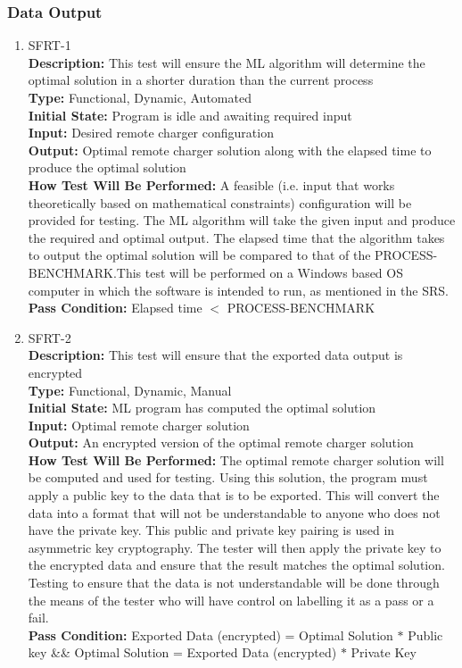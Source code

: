 \documentclass[12pt, titlepage]{article}
\begin{document}
\subsubsection{Data Output}
\begin{enumerate}
    \hypertarget{SFRT-1Anchor}{}
    \item{SFRT-1\\}
    \textbf{Description:} This test will ensure the ML algorithm will determine the optimal solution in a shorter duration than the current process\\
    \textbf{Type:} Functional, Dynamic, Automated\\
    \textbf{Initial State:} Program is idle and awaiting required input\\
    \textbf{Input:} Desired remote charger configuration\\
    \textbf{Output:} Optimal remote charger solution along with the elapsed time to produce the optimal solution\\
    \textbf{How Test Will Be Performed:} A feasible (i.e. input that works theoretically based on mathematical constraints) configuration will be provided for testing. The ML algorithm will take the given input and produce the required and optimal output. The elapsed time that the algorithm takes to output the optimal solution will be compared to that of the PROCESS-BENCHMARK.This test will be performed on a Windows based OS computer in which the software is intended to run, as mentioned in the SRS. \\
    \textbf{Pass Condition:} Elapsed time $<$ PROCESS-BENCHMARK\\

    \hypertarget{SFRT-2Anchor}{}
    \item{SFRT-2\\}
    \textbf{Description:} This test will ensure that the exported data output is encrypted\\
    \textbf{Type:} Functional, Dynamic, Manual\\
    \textbf{Initial State:} ML program has computed the optimal solution\\
    \textbf{Input:} Optimal remote charger solution\\
    \textbf{Output:} An encrypted version of the optimal remote charger solution\\
    \textbf{How Test Will Be Performed:} The optimal remote charger solution will be computed and used for testing. Using this solution, the program must apply a public key to the data that is to be exported. This will convert the data into a format that will not be understandable to anyone who does not have the private key. This public and private key pairing is used in asymmetric key cryptography. The tester will then apply the private key to the encrypted data and ensure that the result matches the optimal solution. Testing to ensure that the data is not understandable will be done through the means of the tester who will have control on labelling it as a pass or a fail.\\
    \textbf{Pass Condition:} Exported Data (encrypted) = Optimal Solution $*$ Public key \&\& Optimal Solution = Exported Data (encrypted) $*$ Private Key\\
    

\end{enumerate}
\end{document}

